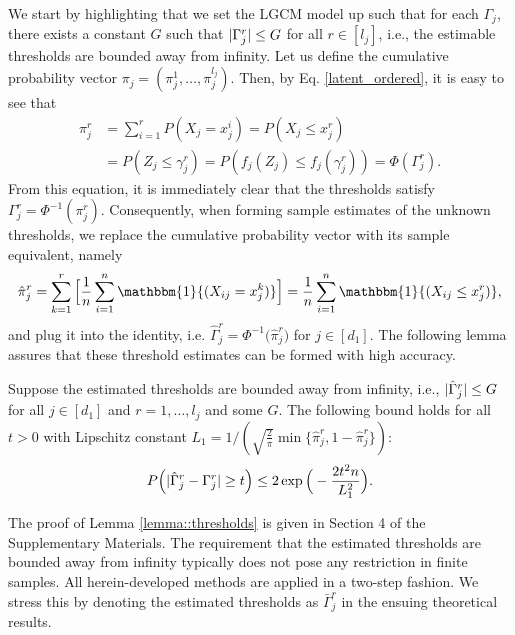 We start by highlighting that we set the LGCM model up such that for each $\Gamma_j$, there exists a constant $G$ such that $\lvert\Gamma^r_j\rvert \leq G$ for all $r \in [l_{j}]$, i.e., the estimable thresholds are bounded away from infinity. Let us define the cumulative probability vector $\pi_j = (\pi^1_j, \dots, \pi^{l_{j}}_j)$. Then, by Eq. \eqref{latent_ordered}, it is easy to see that
\begin{equation}\label{thresholds_identity}
    \begin{split}
        \pi^r_j &= \sum_{i=1}^r P(X_j = x^i_j) = P(X_j \leq x^r_j) \\
        &= P(Z_j \leq \gamma_j^r) = P(f_j(Z_j) \leq f_j(\gamma_j^r)) = \Phi(\Gamma^r_j).
    \end{split}
\end{equation}
From this equation, it is immediately clear that the thresholds satisfy $\Gamma^{r}_{j} = \Phi^{-1}( \pi^r_j )$. Consequently, when forming sample estimates of the unknown thresholds, we replace the cumulative probability vector with its sample equivalent, namely
\begin{equation}
    \hat\pi^r_j = \sum_{k=1}^r \Big[\frac{1}{n} \sum_{i=1}^n \mathbbm{1}{(X_{ij} = x^k_j)}\Big] = \frac{1}{n} \sum_{i=1}^n \mathbbm{1}{(X_{ij} \leq x^r_j)},
\end{equation}
and plug it into the identity, i.e. $\hat\Gamma^r_j = \Phi^{-1}\big( \hat\pi^r_j \big)$ for $j \in [d_1]$. The following lemma assures that these threshold estimates can be formed with high accuracy.
\begin{lemma}\label{lemma::thresholds}
    Suppose the estimated thresholds are bounded away from infinity, i.e., \(\lvert\hat\Gamma^r_j\rvert \leq G\) for all $j \in [d_1]$ and $r = 1, \dots, l_j$ and some \(G\). The following bound holds for all $t > 0$ with Lipschitz constant \(L_1 = 1/(\sqrt{\frac{2}{\pi}} \min\{\hat\pi^r_j, 1- \hat\pi^r_j\})\):
    \begin{equation*}
        P\Big(\Abs{\hat\Gamma_j^r - \Gamma_j^r} \geq t \Big) \leq 2\exp{\Big(- \frac{2t^2n}{L_1^2}\Big)}.
    \end{equation*}
\end{lemma}

The proof of Lemma \ref{lemma::thresholds} is given in Section 4 %
of the Supplementary Materials. The requirement that the estimated thresholds are bounded away from infinity typically does not pose any restriction in finite samples. All herein-developed methods are applied in a two-step fashion. We stress this by denoting the estimated thresholds as $\bar{\Gamma}_j^r$ in the ensuing theoretical results.

